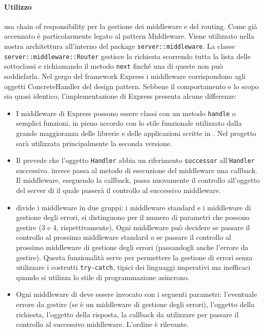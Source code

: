 \documentclass[12pt,a4paper]{article}
\begin{document}
\paragraph{Utilizzo}
 usa chain of responsibility per la gestione dei middleware e del routing. Come già accennato è particolarmente legato al pattern Middleware. Viene utilizzato nella nostra architettura all’interno del package \texttt{server::middleware}. La classe \texttt{server::middleware::Router} gestisce la richiesta scorrendo tutta la lista delle sottoclassi e richiamando il metodo \texttt{next} finché una di queste non può soddisfarla. Nel gergo del framework Express i middleware corrispondono agli oggetti ConcreteHandler del design pattern. Sebbene il comportamento e lo scopo sia quasi identico, l’implementazione di Express presenta alcune differenze:

\begin{itemize}
	\item I middleware di Express possono essere classi con un metodo \texttt{handle} o semplici funzioni, in pieno accordo con lo stile funzionale utilizzato dalla grande maggioranza delle librerie e delle applicazioni scritte in . Nel progetto sarà utilizzata principalmente la seconda versione.
	\item Il  prevede che l’oggetto \texttt{Handler} abbia un riferimento \texttt{successor} all’\texttt{Handler} successivo.  invece passa al metodo di esecuzione del middleware una callback. Il middleware, eseguendo la callback, passa nuovamente il controllo all’oggetto del server di  il quale passerà il controllo al successivo middleware.
	\item {} divide i middleware in due gruppi: i middleware standard e i middleware di gestione degli errori, si distinguono per il numero di parametri che possono gestire (3 e 4, rispettivamente). Ogni middleware può decidere se passare il controllo al prossimo middleware standard o se passare il controllo al prossimo middleware di gestione degli errori (passandogli anche l’errore da gestire). Questa funzionalità serve per permettere la gestione di errori senza utilizzare i costrutti \texttt{try-catch}, tipici dei linguaggi imperativi ma inefficaci quando si utilizza lo stile di programmazione asincrono.
	\item Ogni middleware di  deve essere invocato con i seguenti parametri: l’eventuale errore da gestire (se è un middleware di gestione degli errori), l’oggetto della richiesta, l’oggetto della risposta, la callback da utilizzare per passare il controllo al successivo middleware. L’ordine è rilevante.
\end{itemize}
\end{document}
